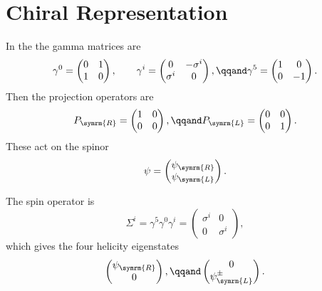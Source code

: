 \documentclass[fleqn]{NotesClass}
\newcommand{\Left}{\symrm{L}}
\newcommand{\Right}{\symrm{R}}
\begin{document}
    \section{Chiral Representation}
    In the  the gamma matrices are
    \begin{equation}
        \gamma^0 = 
        \begin{pmatrix}
            0 & 1\\
            1 & 0
        \end{pmatrix}
        , \qquad \gamma^i = 
        \begin{pmatrix}
            0 & -\sigma^i\\
            \sigma^i & 0
        \end{pmatrix}
        , \qqand \gamma^5 = 
        \begin{pmatrix}
            1 & 0\\
            0 & -1
        \end{pmatrix}
        .
    \end{equation}
    Then the projection operators are
    \begin{equation}
        P_{\Right} = 
        \begin{pmatrix}
            1 & 0\\
            0 & 0
        \end{pmatrix}
        , \qqand P_{\Left} = 
        \begin{pmatrix}
            0 & 0\\
            0 & 1
        \end{pmatrix}
        .
    \end{equation}
    These act on the spinor
    \begin{equation}
        \psi = 
        \begin{pmatrix}
            \psi_{\Right}\\ \psi_{\Left}
        \end{pmatrix}
        .
    \end{equation}
    
    The spin operator is
    \begin{equation}
        \Sigma^i = \gamma^5\gamma^0\gamma^i = 
        \begin{pmatrix}
            \sigma^i & 0\\
            0 & \sigma^i
        \end{pmatrix}
        ,
    \end{equation}
    which gives the four helicity eigenstates
    \begin{equation}
        \begin{pmatrix}
            \psi_{\Right}\\ 0
        \end{pmatrix}
        , \qqand 
        \begin{pmatrix}
            0\\ \psi^{\pm}_{\Left}
        \end{pmatrix}
        .
    \end{equation}
    
\end{document}
